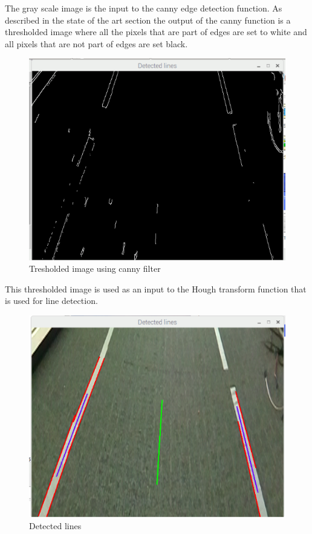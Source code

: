 The gray scale image is the input to the canny edge detection function. As described in the state of the art section the output of the canny function is a thresholded image where all the pixels that are part of edges are set to white and all pixels that are not part of edges are set black.

\begin{figure}[H]
  \includegraphics[width=\textwidth]{./img/edges.png}
  \centering
  \caption{Tresholded image using canny filter}
  \label{fig:Tresholded image using canny filter}
\end{figure}

This thresholded image is used as an input to the Hough transform function that is used for line detection.


\begin{figure}[H]
  \includegraphics[width=\textwidth]{./img/detected_lines.png}
  \centering
  \caption{Detected lines}
  \label{fig:Detected lines}
\end{figure}


